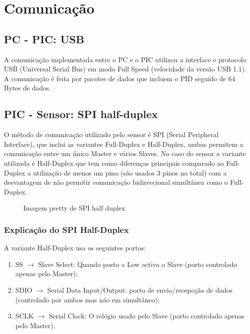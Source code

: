 \documentclass[a4paper]{article}
\begin{document}


\tableofcontents
\pagebreak

\section{Comunicação}

\subsection{PC - PIC: USB}
A comunicação implementada entre o PC e o PIC utilizou a interface e protocolo USB (Universal Serial Bus) em modo Full Speed (velocidade da versão USB 1.1).
A comunicação é feita por pacotes de dados que incluem o PID seguido de 64 Bytes de dados.   

\subsection{PIC - Sensor: SPI half-duplex}
O método de comunicação utilizado pelo sensor é SPI (Serial Peripheral Interface), que inclui as variantes Full-Duplex e Half-Duplex, ambas permitem a comunicação entre um único Master e vários Slaves.
No caso do sensor a variante utilizada é Half-Duplex que tem como diferenças principais comparado ao Full-Duplex a utilização de menos um pino (são usados 3 pinos no total) com a desvantagem de não permitir comunicação bidireccional simultânea como o Full-Duplex.

\begin{figure}[H]
	\centering

	\caption{Imagem pretty de SPI half duplex}
	\label{fig:SPI_halfduplex}
\end{figure}

\subsubsection{Explicação do SPI Half-Duplex}  
A variante Half-Duplex usa os seguintes portos:
\begin{enumerate}
	\item SS $\rightarrow$ Slave Select: Quando posto a Low activa o Slave (porto controlado apenas pelo Master);
	\item SDIO $\rightarrow$ Serial Data Input/Output: porto de envio/recepcção de dados (controlado por ambos mas não em simultâneo);
	\item SCLK $\rightarrow$ Serial Clock: O relógio usado pelo Slave (porto controlado apenas pelo Master).
\end{enumerate}
\end{document}
